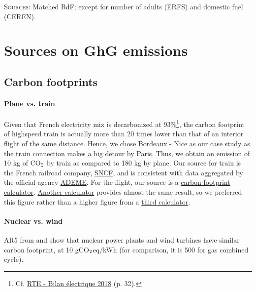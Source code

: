 \documentclass[english,5p,authoryear]{elsarticle}
\begin{document}
\begin{appendices}
\begin{table}[!htbp]
     \footnotesize{\textsc{Sources:} Matched BdF; except for number of adults (ERFS) and domestic fuel (\href{https://www.lesechos.fr/industrie-services/energie-environnement/le-chauffage-au-fioul-devient-de-plus-en-plus-cher-147372}{CEREN}).}
\end{table}

\section{Sources on GhG emissions\label{app:sources}}

\subsection{Carbon footprints\label{app:footprint}}

\paragraph{Plane vs. train}

Given that French electricity mix is decarbonized at 93\%\footnote{Cf. \href{https://www.rte-france.com/sites/default/files/be_pdf_2018v3.pdf}{RTE - Bilan électrique 2018} (p. 32).}, the carbon footprint of highspeed train is actually more than 20 times lower than that of an interior flight of the same distance. Hence, we chose Bordeaux - Nice as our case study as the train connection makes a big detour by Paris. Thus, we obtain an emission of 10 kg of CO$_\textnormal{2}$ by train as compared to 180 kg by plane. Our source for train is the French railroad company, \href{https://www.oui.sncf/aide/calcul-des-emissions-de-co2-sur-votre-trajet-en-train}{SNCF}, and is consistent with data aggregated by the official agency \href{basecarbone.fr}{ADEME}. For the flight, our source is a  \href{https://calculator.carbonfootprint.com/calculator.aspx?tab=3}{carbon footprint calculator}. \href{http://www.climatecare.org/home.aspx}{Another calculator} provides almost the same result, so we preferred this figure rather than a higher figure from a \href{https://co2.myclimate.org/fr/flight_calculators}{third calculator}.

\paragraph{Nuclear vs. wind}

AR5 from \citet{ar5_ar5_nodate} and \citet{pehl_understanding_2017} show that nuclear power plants and wind turbines have similar carbon footprint, at 10 gCO$_\textnormal{2}$eq$/$kWh (for comparison, it is 500 for gas combined cycle).


\end{appendices}
\end{document}
